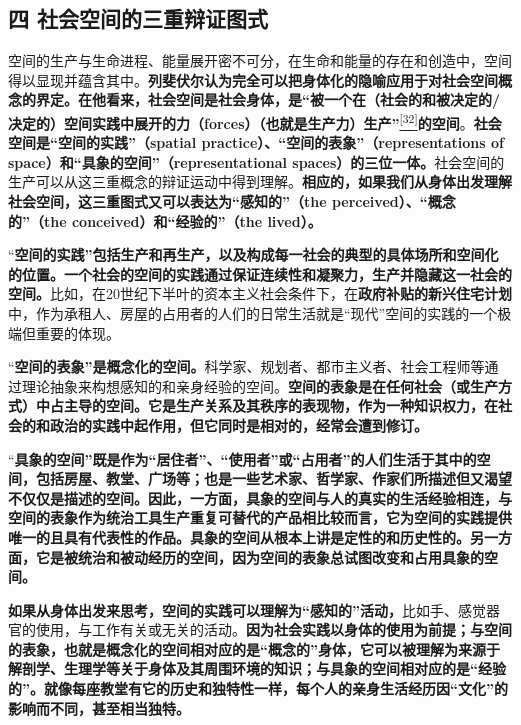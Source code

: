 \documentclass[UTF8, fontset = sourcesans, a4paper, oneside, zihao =
-4, scheme=chinese, no-math, space=true]{ctexbook}
\begin{document}
\subsection{四
社会空间的三重辩证图式}\label{part0006_split_002.htmlux5cux23c019}

空间的生产与生命进程、能量展开密不可分，在生命和能量的存在和创造中，空间得以显现并蕴含其中。\textbf{列斐伏尔认为完全可以把身体化的隐喻应用于对社会空间概念的界定。在他看来，社会空间是社会身体，是``被一个在（社会的和被决定的/决定的）空间实践中展开的力（forces）（也就是生产力）生产''}\protect\hypertarget{part0006_split_002.htmlux5cux23w32}{}{}\protect\hyperlink{part0006_split_003.htmlux5cux23m32}{\textsuperscript{{[}32{]}}}\textbf{的空间}。\textbf{社会空间是``空间的实践''（spatial
practice）、``空间的表象''（representations of
space）和``具象的空间''（representational
spaces）的三位一体。}社会空间的生产可以从这三重概念的辩证运动中得到理解。\textbf{相应的，如果我们从身体出发理解社会空间，这三重图式又可以表达为``感知的''（the
perceived）、``概念的''（the conceived）和``经验的''（the lived）。}

``\textbf{空间的实践''包括生产和再生产，以及构成每一社会的典型的具体场所和空间化的位置。一个社会的空间的实践通过保证连续性和凝聚力，生产并隐藏这一社会的空间。}比如，在20世纪下半叶的资本主义社会条件下，在\textbf{政府补贴的新兴住宅计划}中，作为承租人、房屋的占用者的人们的日常生活就是``现代''空间的实践的一个极端但重要的体现。

``\textbf{空间的表象''是概念化的空间。}科学家、规划者、都市主义者、社会工程师等通过理论抽象来构想感知的和亲身经验的空间。\textbf{空间的表象是在任何社会（或生产方式）中占主导的空间。它是生产关系及其秩序的表现物，作为一种知识权力，在社会的和政治的实践中起作用，但它同时是相对的，经常会遭到修订。}

``\textbf{具象的空间''既是作为``居住者''、``使用者''或``占用者''的人们生活于其中的空间，包括房屋、教堂、广场等；也是一些艺术家、哲学家、作家们所描述但又渴望不仅仅是描述的空间。因此，一方面，具象的空间与人的真实的生活经验相连，与空间的表象作为统治工具生产重复可替代的产品相比较而言，它为空间的实践提供唯一的且具有代表性的作品。具象的空间从根本上讲是定性的和历史性的。另一方面，它是被统治和被动经历的空间，因为空间的表象总试图改变和占用具象的空间。}

\textbf{如果从身体出发来思考，空间的实践可以理解为``感知的''活动，}比如手、感觉器官的使用，与工作有关或无关的活动。\textbf{因为社会实践以身体的使用为前提；与空间的表象，也就是概念化的空间相对应的是``概念的''身体，它可以被理解为来源于解剖学、生理学等关于身体及其周围环境的知识；与具象的空间相对应的是``经验的''。就像每座教堂有它的历史和独特性一样，每个人的亲身生活经历因``文化''的影响而不同，甚至相当独特。}
\end{document}
